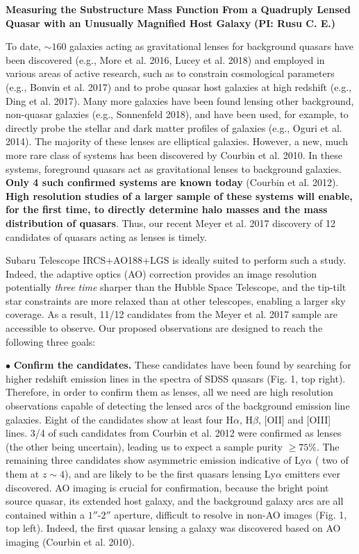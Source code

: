\documentclass[a4paper,11pt]{article}
\begin{document}
\begin {centering}
{\bf Measuring the Substructure Mass Function From a Quadruply Lensed Quasar with an Unusually Magnified Host Galaxy} {\bf (PI: Rusu C. E.)}\\
 \end{centering}
 
\medskip

To date, $\sim160$ galaxies acting as gravitational lenses for background quasars have been discovered (e.g., More et al. 2016, Lucey et al. 2018) and employed in various areas of active research, such as to constrain cosmological parameters (e.g., Bonvin et al. 2017) and to probe quasar host galaxies at high redshift (e.g., Ding et al. 2017). Many more galaxies have been found lensing other background, non-quasar galaxies (e.g., Sonnenfeld 2018), and have been used, for example, to directly probe the stellar and dark matter profiles of galaxies (e.g., Oguri et al. 2014). The majority of these lenses are elliptical galaxies. However, a new, much more rare class of systems has been discovered by Courbin et al. 2010. In these systems, foreground quasars act as gravitational lenses to background galaxies. {\bf Only 4 such confirmed systems are known today} (Courbin et al. 2012). {\bf High resolution studies of a larger sample of these systems will enable, for the first time, to directly determine halo masses and the mass distribution of quasars}. Thus, our recent Meyer et al. 2017 discovery  of 12 candidates of quasars acting as lenses is timely. 

Subaru Telescope IRCS+AO188+LGS is ideally suited to perform such a study. Indeed, the adaptive optics (AO) correction provides an image resolution potentially {\it three time} sharper than the Hubble Space Telescope, and the tip-tilt star constraints are more relaxed than at other telescopes, enabling a larger sky coverage. As a result, 11/12 candidates from the Meyer et al. 2017 sample are accessible to observe. Our proposed observations are designed to reach the following three goals:

$\bullet$ {\bf Confirm the candidates.} These candidates have been found by searching for higher redshift emission lines in the spectra of SDSS quasars (Fig. 1, top right). Therefore, in order to confirm them as lenses, all we need are high resolution observations capable of detecting the lensed arcs of the background emission line galaxies. Eight of the candidates show at least four H$\alpha$, H$\beta$, [OII] and [OIII] lines. 3/4 of such candidates from Courbin et al. 2012 were confirmed as lenses (the other being uncertain), leading us to expect a sample purity $\geq75\%$. The remaining three candidates show asymmetric emission indicative of Ly$\alpha$ ( two of them at $z\sim4$), and are likely to be the first quasars lensing Ly$\alpha$ emitters ever discovered. AO imaging is crucial for confirmation, because the bright point source quasar, its extended host galaxy, and the background galaxy arcs are all contained within a $1''$-$2''$ aperture, difficult to resolve in non-AO images (Fig. 1, top left). Indeed, the first quasar lensing a galaxy was discovered based on AO imaging (Courbin et al. 2010).
\end{document}
